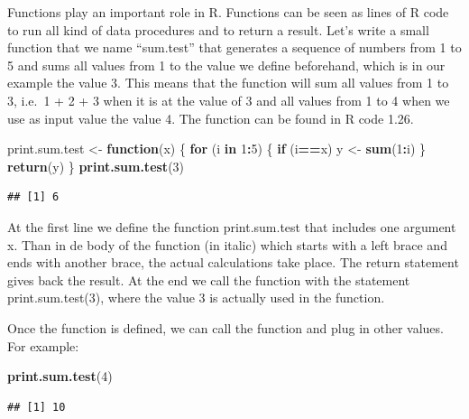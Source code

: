 \documentclass[]{book}
\newenvironment{Shaded}{\begin{snugshade}}{\end{snugshade}}
\newcommand{\KeywordTok}[1]{\textcolor[rgb]{0.13,0.29,0.53}{\textbf{#1}}}
\newcommand{\DecValTok}[1]{\textcolor[rgb]{0.00,0.00,0.81}{#1}}
\newcommand{\StringTok}[1]{\textcolor[rgb]{0.31,0.60,0.02}{#1}}
\newcommand{\ControlFlowTok}[1]{\textcolor[rgb]{0.13,0.29,0.53}{\textbf{#1}}}
\newcommand{\OperatorTok}[1]{\textcolor[rgb]{0.81,0.36,0.00}{\textbf{#1}}}
\newcommand{\NormalTok}[1]{#1}
\begin{document}
Functions play an important role in R. Functions can be seen as lines of
R code to run all kind of data procedures and to return a result. Let's
write a small function that we name ``sum.test'' that generates a
sequence of numbers from 1 to 5 and sums all values from 1 to the value
we define beforehand, which is in our example the value 3. This means
that the function will sum all values from 1 to 3, i.e.~1 + 2 + 3 when
it is at the value of 3 and all values from 1 to 4 when we use as input
value the value 4. The function can be found in R code 1.26.

\begin{Shaded}
\begin{Highlighting}[]
\NormalTok{print.sum.test <-}\StringTok{ }\ControlFlowTok{function}\NormalTok{(x) }
\NormalTok{\{}
 \ControlFlowTok{for}\NormalTok{ (i }\ControlFlowTok{in} \DecValTok{1}\OperatorTok{:}\DecValTok{5}\NormalTok{) }
\NormalTok{ \{}
   \ControlFlowTok{if}\NormalTok{ (i}\OperatorTok{==}\NormalTok{x) y <-}\StringTok{ }\KeywordTok{sum}\NormalTok{(}\DecValTok{1}\OperatorTok{:}\NormalTok{i)  }
\NormalTok{ \}}
\KeywordTok{return}\NormalTok{(y)}
\NormalTok{\}}
\KeywordTok{print.sum.test}\NormalTok{(}\DecValTok{3}\NormalTok{)}
\end{Highlighting}
\end{Shaded}

\begin{verbatim}
## [1] 6
\end{verbatim}

At the first line we define the function print.sum.test that includes
one argument x. Than in de body of the function (in italic) which starts
with a left brace and ends with another brace, the actual calculations
take place. The return statement gives back the result. At the end we
call the function with the statement print.sum.test(3), where the value
3 is actually used in the function.

Once the function is defined, we can call the function and plug in other
values. For example:

\begin{Shaded}
\begin{Highlighting}[]
\KeywordTok{print.sum.test}\NormalTok{(}\DecValTok{4}\NormalTok{)}
\end{Highlighting}
\end{Shaded}

\begin{verbatim}
## [1] 10
\end{verbatim}
\end{document}
